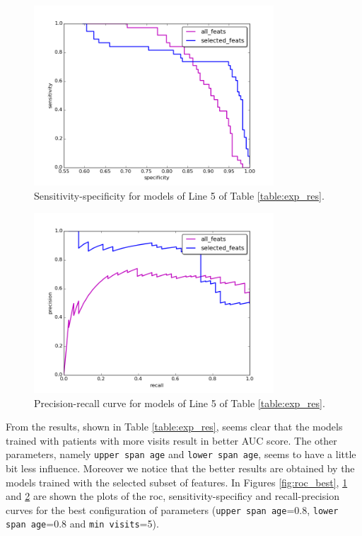 \begin{figure}[h]
	\centering
	\includegraphics[width= 0.8\textwidth]{chapter4/specificity_sensitivity_comp.png}
	\caption{Sensitivity-specificity for models of Line 5 of Table \ref{table:exp_res}.}
	\label{fig:sensitivity_specificity_best}
\end{figure}

\begin{figure}[h]
	\centering
	\includegraphics[width= 0.8\textwidth]{chapter4/precision_recall_comp.png}
	\caption{Precision-recall curve for models of Line 5 of Table \ref{table:exp_res}.}
	\label{fig:precision_recall_best}
\end{figure}

From the results, shown in Table \ref{table:exp_res}, seems clear that the models trained with patients with more visits result in better AUC score. The other parameters, namely \texttt{upper span age} and \texttt{lower span age}, seems to have a little bit less influence. Moreover we notice that the better results are obtained by the models trained with the selected subset of features. In Figures \ref{fig:roc_best}, \ref{fig:sensitivity_specificity_best} and \ref{fig:precision_recall_best} are shown the plots of the roc, sensitivity-specificy and recall-precision curves for the best configuration of parameters (\texttt{upper span age}=0.8, \texttt{lower span age}=0.8 and \texttt{min visits}=5).
